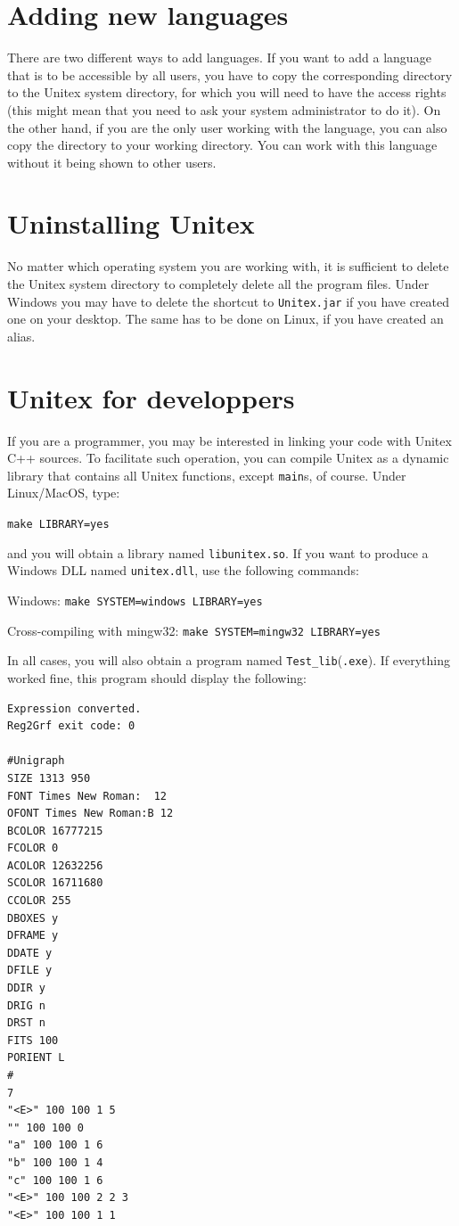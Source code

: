 \section{Adding new languages}

\bigskip
\noindent There are two different ways to add languages. If you want to add 
a language that is to be accessible by all  users, you have to copy the 
corresponding directory to the Unitex system directory, for which 
you will need to have the access rights  (this might mean that you need to 
ask your system administrator to do it). On the other hand, if you are the only user working
with the language, you can also copy the directory to your working 
directory.
You can work with this language without it being shown to other users.


\section{Uninstalling Unitex}
No matter which operating system you are working with, it is sufficient to delete 
the Unitex system directory to completely delete all the program files. Under
Windows you may have to delete the shortcut to \verb+Unitex.jar+  
if you have created one on your desktop. The same has to be done on Linux, if you have 
created an alias.


\section{Unitex for developpers}
\label{section-unitex-developpers}
If you are a programmer, you may be interested in linking your code with Unitex
C++ sources. To facilitate such operation, you can compile Unitex as a
dynamic library that contains all Unitex functions, except \verb+main+s, of
course. Under Linux/MacOS, type:

\bigskip
\verb+make LIBRARY=yes+

\bigskip
\noindent and you will obtain a library named \verb+libunitex.so+. If you want
to produce a Windows DLL named \verb+unitex.dll+, use the following commands:

\bigskip
Windows: \verb+make SYSTEM=windows LIBRARY=yes+

Cross-compiling with mingw32: \verb+make SYSTEM=mingw32 LIBRARY=yes+

\bigskip
\noindent In all cases, you will also obtain a program named
\verb+Test_lib+(\verb+.exe+). If everything worked fine, this program should 
display the following:

\begin{verbatim}
Expression converted.
Reg2Grf exit code: 0

#Unigraph
SIZE 1313 950
FONT Times New Roman:  12
OFONT Times New Roman:B 12
BCOLOR 16777215
FCOLOR 0
ACOLOR 12632256
SCOLOR 16711680
CCOLOR 255
DBOXES y
DFRAME y
DDATE y
DFILE y
DDIR y
DRIG n
DRST n
FITS 100
PORIENT L
#
7
"<E>" 100 100 1 5
"" 100 100 0
"a" 100 100 1 6
"b" 100 100 1 4
"c" 100 100 1 6
"<E>" 100 100 2 2 3
"<E>" 100 100 1 1
\end{verbatim}
